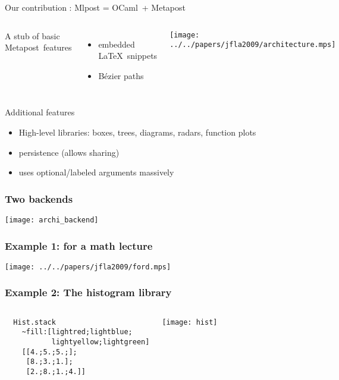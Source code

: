 \documentclass[nodefaultblocks]{beamer}
\newcommand{\ocaml}{OCaml}
\newcommand{\metapost}{Metapost}
\begin{document}
\begin{frame}{Our contribution : Mlpost = \ocaml\ + \metapost}

  \begin{columns}
  A stub of basic \metapost\ features
  \begin{itemize}
    \item embedded \LaTeX\ snippets
      \item Bézier paths
  \end{itemize}

  \texttt{[image: ../../papers/jfla2009/architecture.mps]}
  \end{columns}
  \bigskip
  Additional features
  \begin{itemize}
    \item High-level libraries: boxes, trees, diagrams, radars, function plots
  \item persistence (allows sharing) 
  \item uses optional/labeled arguments massively
  \end{itemize}

\end{frame}

\begin{frame}
  \frametitle{Two backends}
  \begin{center}
  \texttt{[image: archi\_backend]}
  \end{center}
\end{frame}

\begin{frame}
\frametitle{Example 1: for a math lecture}
\begin{center}
  \texttt{[image: ../../papers/jfla2009/ford.mps]} 
\end{center}
\end{frame}

\begin{frame}[fragile]
\frametitle{Example 2: The histogram library}
\begin{columns}
\begin{verbatim}
  Hist.stack 
    ~fill:[lightred;lightblue;
           lightyellow;lightgreen]
    [[4.;5.;5.;]; 
     [8.;3.;1.]; 
     [2.;8.;1.;4.]]  
\end{verbatim}
\begin{center}
  \texttt{[image: hist]}
\end{center}

\end{columns}

\end{frame}
\end{document}
